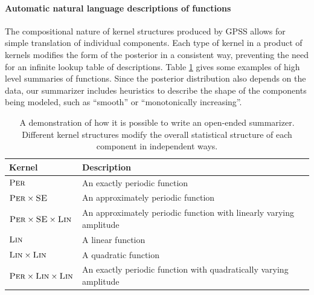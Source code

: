 \documentclass[twoside]{article}
\begin{document}
\vspace{-0.05in}
\paragraph{Automatic natural language descriptions of functions}
%
The compositional nature of kernel structures produced by GPSS allows for simple translation of individual components.
Each type of kernel in a product of kernels modifies the form of the posterior in a consistent way, preventing the need for an infinite lookup table of descriptions.
Table \ref{table:descriptions} gives some examples of high level summaries of functions.
Since the posterior distribution also depends on the data, our summarizer includes heuristics to describe the shape of the components being modeled, such as ``smooth'' or ``monotonically increasing''.

\begin{table}[ht]
\begin{tabular}{l|l}
Kernel & Description \\
\midrule
${\textsc{Per}}$ & An exactly periodic function \\
${\textsc{Per}} \times {\textsc{SE}}$ & An approximately periodic function \\
${\textsc{Per}} \times {\textsc{SE}} \times {\textsc{Lin}}$ & An approximately periodic function with linearly varying amplitude \\
${\textsc{Lin}}$ & A linear function \\
${\textsc{Lin}} \times {\textsc{Lin}}$ & A quadratic function \\
${\textsc{Per}} \times {\textsc{Lin}} \times {\textsc{Lin}}$ & An exactly periodic function with quadratically varying amplitude\\
\end{tabular}
\caption{A demonstration of how it is possible to write an open-ended summarizer.  Different kernel structures modify the overall statistical structure of each component in independent ways.}
\label{table:descriptions}
\end{table}
\end{document}

